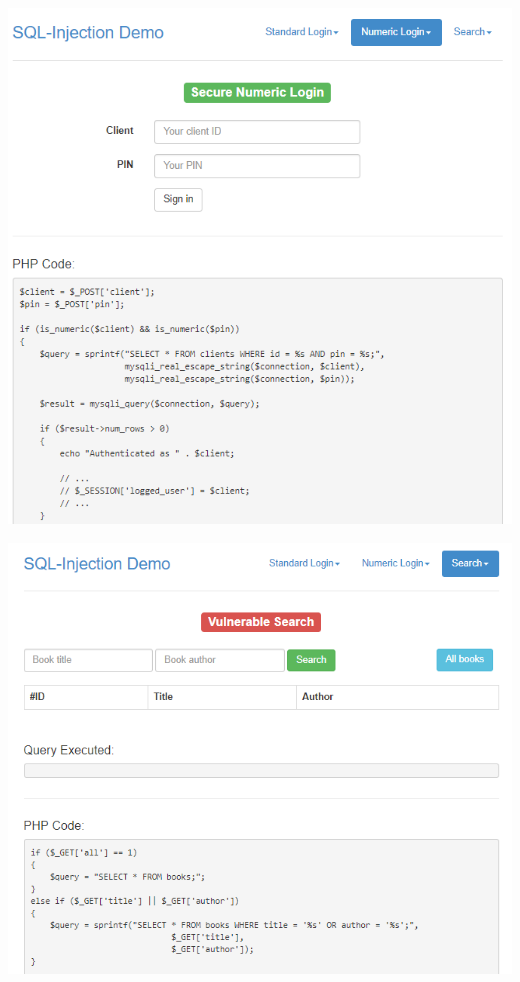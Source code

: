 \documentclass{article}
\begin{document}
\begin{center}
\includegraphics[scale=1]{f5}
\end{center}
\begin{center}
\includegraphics[scale=1]{f6}
\end{center}
\end{document}
